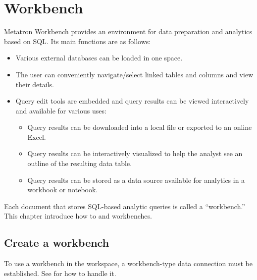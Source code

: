 \documentclass[letterpaper,10pt,english]{sphinxmanual}
\begin{document}
\chapter{Workbench}
\label{\detokenize{discovery/part06/index:id1}}\label{\detokenize{discovery/part06/index::doc}}
\begin{figure}[H]
\centering

\noindent{}
\end{figure}

Metatron Workbench provides an environment for data preparation and analytics based on SQL. Its main functions are as follows:
\begin{itemize}
\item {} 
Various external databases can be loaded in one space.

\item {} 
The user can conveniently navigate/select linked tables and columns and view their details.

\item {} 
Query edit tools are embedded and query results can be viewed interactively and available for various uses:
\begin{itemize}
\item {} 
Query results can be downloaded into a local file or exported to an online Excel.

\item {} 
Query results can be interactively visualized to help the analyst see an outline of the resulting data table.

\item {} 
Query results can be stored as a data source available for analytics in a workbook or notebook.

\end{itemize}

\end{itemize}

Each document that stores SQL-based analytic queries is called a “workbench.” This chapter introduce how to  and  workbenches.


\section{Create a workbench}
\label{\detokenize{discovery/part06/06_02-create_a_workbench:id1}}\label{\detokenize{discovery/part06/06_02-create_a_workbench::doc}}
To use a workbench in the workspace, a workbench-type data connection must be established. See {\hyperref[\detokenize{discovery/part02/data_connection::doc}]{}} for how to handle it.
\end{document}
